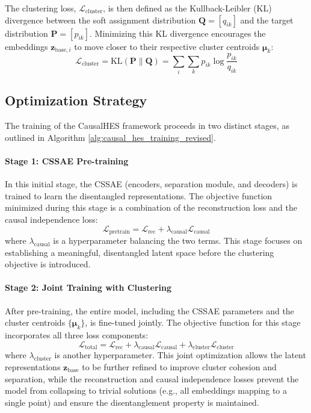 \documentclass[journal]{IEEEtran}
\begin{document}
The clustering loss, $\mathcal{L}_{\text{cluster}}$, is then defined as the Kullback-Leibler (KL) divergence between the soft assignment distribution $\mathbf{Q} = [q_{ik}]$ and the target distribution $\mathbf{P} = [p_{ik}]$. Minimizing this KL divergence encourages the embeddings $\mathbf{z}_{\text{base},i}$ to move closer to their respective cluster centroids $\boldsymbol{\mu}_k$:
\begin{equation}
\mathcal{L}_{\text{cluster}} = \text{KL}(\mathbf{P} \| \mathbf{Q}) = \sum_i \sum_k p_{ik} \log \frac{p_{ik}}{q_{ik}}
\label{eq:clustering_loss_causal_revised}
\end{equation}

\subsection{Optimization Strategy}
The training of the CausalHES framework proceeds in two distinct stages, as outlined in Algorithm \ref{alg:causal_hes_training_revised}.

\paragraph{Stage 1: CSSAE Pre-training}
In this initial stage, the CSSAE (encoders, separation module, and decoders) is trained to learn the disentangled representations. The objective function minimized during this stage is a combination of the reconstruction loss and the causal independence loss:
\begin{equation}
\mathcal{L}_{\text{pretrain}} = \mathcal{L}_{\text{rec}} + \lambda_{\text{causal}} \mathcal{L}_{\text{causal}}
\end{equation}
where $\lambda_{\text{causal}}$ is a hyperparameter balancing the two terms. This stage focuses on establishing a meaningful, disentangled latent space before the clustering objective is introduced.

\paragraph{Stage 2: Joint Training with Clustering}
After pre-training, the entire model, including the CSSAE parameters and the cluster centroids $\{\boldsymbol{\mu}_k\}$, is fine-tuned jointly. The objective function for this stage incorporates all three loss components:
\begin{equation}
\mathcal{L}_{\text{total}} = \mathcal{L}_{\text{rec}} + \lambda_{\text{causal}} \mathcal{L}_{\text{causal}} + \lambda_{\text{cluster}} \mathcal{L}_{\text{cluster}}
\end{equation}
where $\lambda_{\text{cluster}}$ is another hyperparameter. This joint optimization allows the latent representations $\mathbf{z}_{\text{base}}$ to be further refined to improve cluster cohesion and separation, while the reconstruction and causal independence losses prevent the model from collapsing to trivial solutions (e.g., all embeddings mapping to a single point) and ensure the disentanglement property is maintained.
\end{document}
